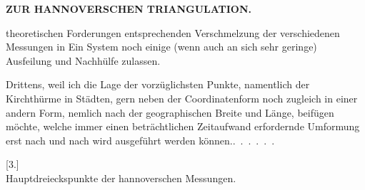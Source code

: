 \par\clearpage
\noindent\null\hfill{\small\textbf{ZUR HANNOVERSCHEN TRIANGULATION.}}\hfill{}\par\medskip

\noindent theoretischen Forderungen entsprechenden Verschmelzung der verschiedenen Messungen in Ein System noch einige (wenn auch an sich sehr geringe) Ausfeilung und Nachhülfe zulassen.

\par\noindent\hspace*{\parindent}Drittens, weil ich die Lage der vorzüglichsten Punkte, namentlich der Kirchthürme in Städten, gern neben der Coordinatenform noch zugleich in einer andern Form, nemlich nach der geographischen Breite und Länge, beifügen möchte, welche immer einen beträchtlichen Zeitaufwand erfordernde Umformung erst nach und nach wird ausgeführt werden \mbox{können.\quad\mbox{.\ .\ .\ .\ .\ .}}

\par\medskip
\begin{center}
[3.]\\
{\large Hauptdreieckspunkte der hannoverschen Messungen.}
\end{center}

